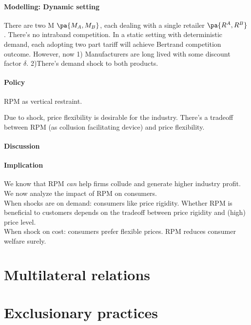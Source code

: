 \paragraph{Modelling: Dynamic setting}
There are two M $\pa{M_A,M_B}$, each dealing with a single retailer $\pa{R^A,R^B}$. There's no intraband competition. In a static setting with deterministic demand, each adopting two part tariff will achieve Bertrand competition outcome. However, now 1) Manufacturers are long lived with some discount factor $\delta$. 2)There's demand shock to both products.
\paragraph{Policy} RPM as vertical restraint.
\begin{remark}
    Due to shock, price flexibility is desirable for the industry. There's a tradeoff between RPM (as collusion facilitating device) and price flexibility.
\end{remark}
\paragraph{Discussion}
\paragraph{Implication}
We know that RPM \emph{can} help firms collude and generate higher industry profit. We now analyze the impact of RPM on consumers. \\
When shocks are on demand: consumers like price rigidity. Whether RPM is beneficial to customers depends on the tradeoff between price rigidity and (high) price level.\\
When shock on cost: consumers prefer flexible prices. RPM reduces consumer welfare surely. 

\section{Multilateral relations}
\section{Exclusionary practices}


